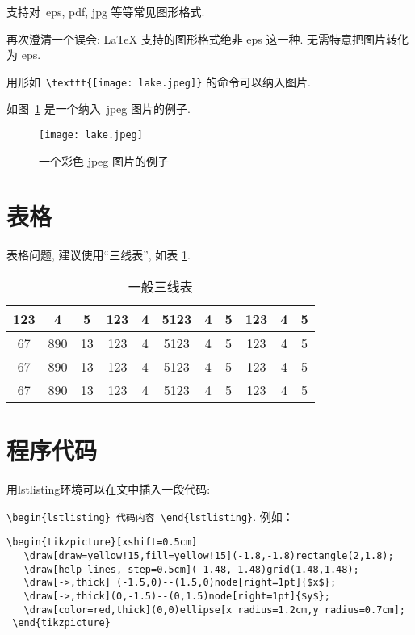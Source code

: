 支持对~eps, pdf, jpg 等等常见图形格式.

再次\colorbox{red!45}{澄清一个误会}: \LaTeX{} 支持的图形格式绝非 eps 这一种. 无需特意把图片转化为 eps.

用形如~\verb|\texttt{[image: lake.jpeg]}| 的命令可以纳入图片.

如图~\ref{fig:2} 是一个纳入~jpeg 图片的例子.

\begin{figure}[ht]
    \centering
    \texttt{[image: lake.jpeg]}
    \caption{一个彩色 jpeg 图片的例子}
    \label{fig:2}
\end{figure}

\section{表格}
表格问题, 建议使用``三线表'', 如表 \ref{tab:1}.

\begin{table}[ht]
    \centering
    \caption{一般三线表}
    \label{tab:1}
    \begin{tabular}{c c c c c c c c c c c}
        \toprule
        123 & 4   & 5  & 123 & 4 & 5123 & 4 & 5 & 123 & 4 & 5 \\
        \midrule
        67  & 890 & 13 & 123 & 4 & 5123 & 4 & 5 & 123 & 4 & 5 \\
        67  & 890 & 13 & 123 & 4 & 5123 & 4 & 5 & 123 & 4 & 5 \\
        67  & 890 & 13 & 123 & 4 & 5123 & 4 & 5 & 123 & 4 & 5 \\
        \bottomrule
    \end{tabular}
\end{table}

\section{程序代码}

用lstlisting环境可以在文中插入一段代码: \par
\verb|\begin{lstlisting} 代码内容 \end{lstlisting}|. 例如：

\begin{lstlisting}
\begin{tikzpicture}[xshift=0.5cm]
   \draw[draw=yellow!15,fill=yellow!15](-1.8,-1.8)rectangle(2,1.8);
   \draw[help lines, step=0.5cm](-1.48,-1.48)grid(1.48,1.48);
   \draw[->,thick] (-1.5,0)--(1.5,0)node[right=1pt]{$x$};
   \draw[->,thick](0,-1.5)--(0,1.5)node[right=1pt]{$y$};
   \draw[color=red,thick](0,0)ellipse[x radius=1.2cm,y radius=0.7cm];
 \end{tikzpicture}
 \end{lstlisting}

